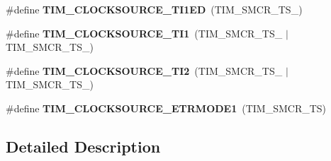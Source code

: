 \begin{DoxyCompactItemize}
\item 
\mbox{\label{group___t_i_m___clock___source_gad8c96337acf40356d82570cc4851ce2d}} 
\#define {\bfseries T\+I\+M\+\_\+\+C\+L\+O\+C\+K\+S\+O\+U\+R\+C\+E\+\_\+\+T\+I1\+ED}~(T\+I\+M\+\_\+\+S\+M\+C\+R\+\_\+\+T\+S\+\_)
\item 
\mbox{\label{group___t_i_m___clock___source_ga0a8708d4dab5cbd557a76efb362e13c0}} 
\#define {\bfseries T\+I\+M\+\_\+\+C\+L\+O\+C\+K\+S\+O\+U\+R\+C\+E\+\_\+\+T\+I1}~(T\+I\+M\+\_\+\+S\+M\+C\+R\+\_\+\+T\+S\+\_ $\vert$ T\+I\+M\+\_\+\+S\+M\+C\+R\+\_\+\+T\+S\+\_)
\item 
\mbox{\label{group___t_i_m___clock___source_ga7950cf616702dd38d8f1ab5091efc012}} 
\#define {\bfseries T\+I\+M\+\_\+\+C\+L\+O\+C\+K\+S\+O\+U\+R\+C\+E\+\_\+\+T\+I2}~(T\+I\+M\+\_\+\+S\+M\+C\+R\+\_\+\+T\+S\+\_ $\vert$ T\+I\+M\+\_\+\+S\+M\+C\+R\+\_\+\+T\+S\+\_)
\item 
\mbox{\label{group___t_i_m___clock___source_gaa7743af6f4b8869cad0375526c6145ce}} 
\#define {\bfseries T\+I\+M\+\_\+\+C\+L\+O\+C\+K\+S\+O\+U\+R\+C\+E\+\_\+\+E\+T\+R\+M\+O\+D\+E1}~(T\+I\+M\+\_\+\+S\+M\+C\+R\+\_\+\+TS)
\end{DoxyCompactItemize}


\subsection{Detailed Description}

